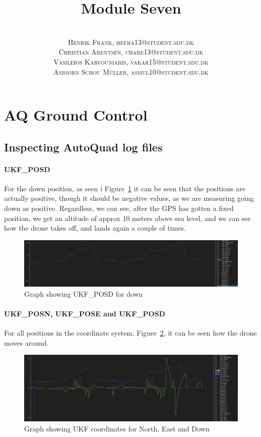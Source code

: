 \documentclass[paper=letter, fontsize=10pt]{article}
\title{\vspace{-15mm}\fontsize{24pt}{10pt}\selectfont\textbf{Module Seven }} %
\author{
\large
{\textsc{}}\\[2mm]
{\textsc{Henrik Frank, hefra13@student.sdu.dk }}\\[2mm]
{\textsc{Christian Arentsen, chare13@student.sdu.dk }}\\[2mm]
{\textsc{Vasileios Karvouniaris, vakar15@student.sdu.dk }}\\[2mm]
{\textsc{Asbjørn Schou Müller, asmul10@student.sdu.dk }}
}
\date{}
\begin{document}
\maketitle %
\thispagestyle{fancy} %


\section{AQ Ground Control}
\subsection{Inspecting AutoQuad log files}
\paragraph{UKF\_POSD}
For the down position, as seen i Figure~\ref{ukf_down} it can be seen that the positions are actually positive, though it should be negative values, as we are measuring going down as positive. Regardless, we can see, after the GPS has gotten a fixed position, we get an altitude of approx 10 meters above sea level, and we can see how the drone takes off, and lands again a couple of times. 
\begin{figure}
\centering
\includegraphics[width=1\textwidth]{Figures/UKF_POSD}
\caption{Graph showing UKF\_POSD for down}
\label{ukf_down}
\end{figure}


\paragraph{UKF\_POSN, UKF\_POSE and UKF\_POSD}
For all positions in the coordinate system, Figure~\ref{ukf_all}, it can be seen how the drone moves around.

\begin{figure}
\centering
\includegraphics[width=1\textwidth]{Figures/UKF_All}
\caption{Graph showing UKF coordinates for North, East and Down}
\label{ukf_all}
\end{figure}
\end{document}
